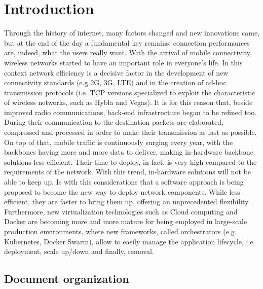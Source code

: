  
\chapter{Introduction}
\label{chap:intro}

 Through the history of internet, many factors changed and new innovations came,
 but at the end of the day a fundamental key remains: connection performances
 are, indeed, what the users really want. With the arrival of mobile
 connectivity, wireless networks started to have an important role in everyone's
 life. In this context network efficiency is a decisive factor in the
 development of new connectivity standards (e.g 2G, 3G, LTE) and in the creation
 of ad-hoc transmission protocols (i.e. TCP versions specialized to exploit the
 characteristic of wireless networks, such as Hybla and Vegas). It is for this
 reason that, beside improved radio communications, back-end infrastructure
 began to be refined too. During their communication to the destination packets
 are elaborated, compressed and processed in order to make their transmission as
 fast as possible. On top of that, mobile traffic is continuously surging every
 year, with the backbones having more and more data to deliver, making
 in-hardware backbone solutions less efficient. Their time-to-deploy, in fact,
 is very high compared to the requirements of the network. With this trend,
 in-hardware solutions will not be able to keep up. Is with this considerations
 that a software approach is being proposed to become the new way to deploy
 network components. While less efficient, they are faster to bring them up,
 offering an unprecedented flexibility~\cite{nguyen2017sdn}. Furthermore, new
 virtualization technologies such as Cloud computing and Docker are becoming
 more and more mature for being employed in large-scale production environments,
 where new frameworks, called orchestrators (e.g. Kubernetes, Docker Swarm),
 allow to easily manage the application lifecycle, i.e. deployment, scale
 up/down and finally, removal.

 \newpage
 
 \section*{Document organization}
 
